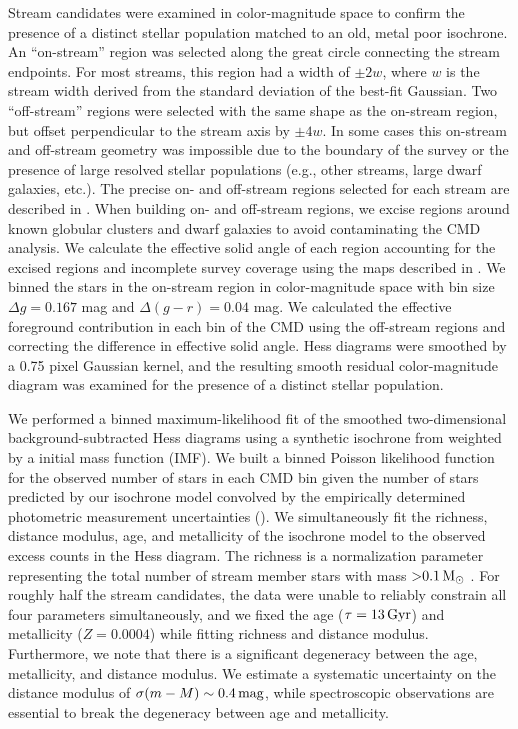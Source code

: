 \documentclass[twocolumn]{aastex61}
\begin{document}
Stream candidates were examined in color-magnitude space to confirm the presence of a distinct stellar population matched to an old, metal poor isochrone.
An ``on-stream'' region was selected along the great circle connecting the stream endpoints. For most streams, this region had a width of $\pm 2w$, where $w$ is the stream width derived from the standard deviation of the best-fit Gaussian.
Two ``off-stream'' regions were selected with the same shape as the on-stream region, but offset perpendicular to the stream axis by $\pm 4w$. In some cases this on-stream and off-stream geometry was impossible due to the boundary of the survey or the presence of large resolved stellar populations (e.g., other streams, large dwarf galaxies, etc.). The precise on- and off-stream regions selected for each stream are described in .
When building on- and off-stream regions, we excise regions around known globular clusters and dwarf galaxies to avoid contaminating the CMD analysis.
We calculate the effective solid angle of each region accounting for the excised regions and incomplete survey coverage using the maps described in .
We binned the stars in the on-stream region in color-magnitude space with bin size $\Delta g = 0.167$ mag and $\Delta (g-r) = 0.04$ mag.
We calculated the effective foreground contribution in each bin of the CMD using the off-stream regions and correcting the difference in effective solid angle.
Hess diagrams were smoothed by a 0.75 pixel Gaussian kernel, and the resulting smooth residual color-magnitude diagram was examined for the presence of a distinct stellar population. 

We performed a binned maximum-likelihood fit of the smoothed two-dimensional background-subtracted Hess diagrams using a synthetic isochrone from \citet{Dotter:2008} weighted by a \citet{Chabrier:2001} initial mass function (IMF).
We built a binned Poisson likelihood function for the observed number of stars in each CMD bin given the number of stars predicted by our isochrone model convolved by the empirically determined photometric measurement uncertainties (). 
We simultaneously fit the richness, distance modulus, age, and metallicity of the isochrone model to the observed excess counts in the Hess diagram.
The richness is a normalization parameter representing the total number of stream member stars with mass ${>}0.1 \mathrm{\,M_\odot}$ \citep{Bechtol:2015}.
For roughly half the stream candidates, the data were unable to reliably constrain all four parameters simultaneously, and we fixed the age (${\tau} = 13 \mathrm{\,Gyr}$) and metallicity ($Z = 0.0004$) while fitting richness and distance modulus.
Furthermore, we note that there is a significant degeneracy between the age, metallicity, and distance modulus. 
We estimate a systematic uncertainty on the distance modulus of $\sigma(m - M) \sim 0.4 \mathrm{\,mag}$, while spectroscopic observations are essential to break the degeneracy between age and metallicity.
\end{document}
